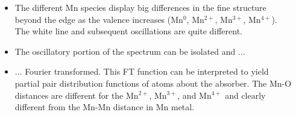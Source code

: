 \documentclass[10pt, xcolor=x11names, compress, handout]{beamer}
\begin{document}
\begin{frame}
\begin{columns}[T]
\begin{column}{0.34\linewidth}
    \end{column}
    \begin{column}{0.66\linewidth}
      \begin{itemize}[<+->]
      \item The different Mn species display big differences in the
        fine structure beyond the edge as the valence increases
        ({\color{Blue3}Mn$^0$}, \alert{Mn$^{2+}$},
        {\color{Green4}Mn$^{3+}$}, {\color{Purple3}Mn$^{4+}$}).  The
        white line and subsequent oscillations are quite
        different.\\[3ex]
      \item The oscillatory portion of the spectrum can be isolated
        and ...\\[3ex]
      \item ... Fourier transformed.  This FT function can be
        interpreted to yield partial pair distribution functions of
        atoms about the absorber.  The Mn-O distances are different
        for the \alert{Mn$^{2+}$}, {\color{Green4}Mn$^{3+}$}, and
        {\color{Purple3}Mn$^{4+}$} and clearly different from the
        Mn-Mn distance in {\color{Blue3}Mn metal}.
      \end{itemize}
    \end{column}
  \end{columns}
\end{frame}
\end{document}
